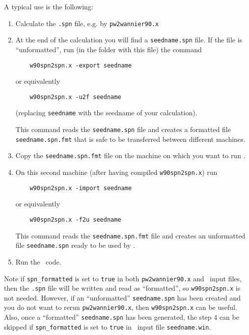 A typical use is the following:
\begin{enumerate}
	\item Calculate the \verb|.spn| file, e.g. by \texttt{pw2wannier90.x}
	\item At the end of the calculation you will find a \verb|seedname.spn|
	file. If the file is ``unformatted'', run (in the folder with this file) the command
	\begin{verbatim}
	w90spn2spn.x -export seedname
	\end{verbatim}
	or equivalently
	\begin{verbatim}
	w90spn2spn.x -u2f seedname
	\end{verbatim}
	(replacing \verb|seedname| with the seedname of your calculation).
	
	This command reads the \verb|seedname.spn| file and creates a
	formatted file  \verb|seedname.spn.fmt| that is safe to be transferred
	between different machines.
	\item Copy the \verb|seedname.spn.fmt| file on the machine on
	which you want to run \postw.
	\item On this second machine (after having compiled
	\verb|w90spn2spn.x|) run
	\begin{verbatim}
	w90spn2spn.x -import seedname
	\end{verbatim}
	or equivalently
	\begin{verbatim}
	w90spn2spn.x -f2u seedname
	\end{verbatim}
	
	This command reads the \verb|seedname.spn.fmt| file and creates an
	unformatted file \verb|seedname.spn| ready to be used by \postw.
	
	\item Run the \postw\ code.
	
\end{enumerate}

Note if \texttt{spn\_formatted} is set to \texttt{true} in both 
\texttt{pw2wannier90.x} and \postw\ input files, then the \verb|.spn| file will 
be written and read as ``formatted'', so \texttt{w90spn2spn.x} is not needed. 
However, if an ``unformatted'' \verb|seedname.spn| has been created and 
you do not want to rerun \texttt{pw2wannier90.x}, then 
\texttt{w90spn2spn.x} can be useful. 
Also, once a ``formatted'' \verb|seedname.spn| has been generated, the step 4 can be skipped if 
\texttt{spn\_formatted} is set to \texttt{true} in \postw\ input file \verb|seedname.win|.